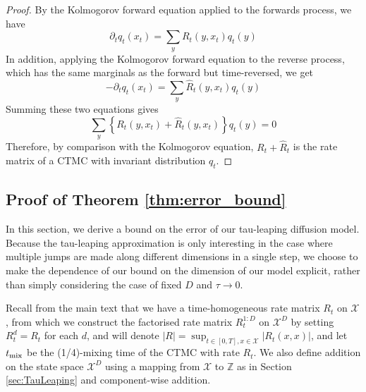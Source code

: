 \documentclass{article}
\begin{document}
\begin{proof}
By the Kolmogorov forward equation applied to the forwards process, we have
\begin{equation}
    \partial_t q_t(x_t) = \sum_y R_t(y, x_t) q_t(y)
\end{equation}
In addition, applying the Kolmogorov forward equation to the reverse process, which has the same marginals as the forward but time-reversed, we get
\begin{equation}
    - \partial_t q_t(x_t) = \sum_y \hat{R}_t(y, x_t) q_t(y)
\end{equation}
Summing these two equations gives
\begin{equation}
    \sum_y \left\{ R_t(y, x_t) + \hat{R}_t(y, x_t) \right\} q_t(y) = 0
\end{equation}
Therefore, by comparison with the Kolmogorov equation, $R_t + \hat{R}_t$ is the rate matrix of a CTMC with invariant distribution $q_t$.
\end{proof}
















\subsection{Proof of Theorem \ref{thm:error_bound}}
\label{sec:ApdxErrorBound}

In this section, we derive a bound on the error of our tau-leaping diffusion model. Because the tau-leaping approximation is only interesting in the case where multiple jumps are made along different dimensions in a single step, we choose to make the dependence of our bound on the dimension of our model explicit, rather than simply considering the case of fixed $D$ and $\tau \rightarrow 0$.

Recall from the main text that we have a time-homogeneous rate matrix $R_t$ on $\mathcal{X}$, from which we construct the factorised rate matrix $R_t^{1:D}$ on $\mathcal{X}^D$ by setting $R^d_t = R_t$ for each $d$, and will denote $|R| = \sup_{t \in [0,T], x \in \mathcal{X}} |R_t(x,x)|$, and let $t_{\textup{mix}}$ be the (1/4)-mixing time of the CTMC with rate $R_t$. We also define addition on the state space $\mathcal{X}^D$ using a mapping from $\mathcal{X}$ to $\mathbb{Z}$ as in Section {\ref{sec:TauLeaping}} and component-wise addition.
\end{document}
